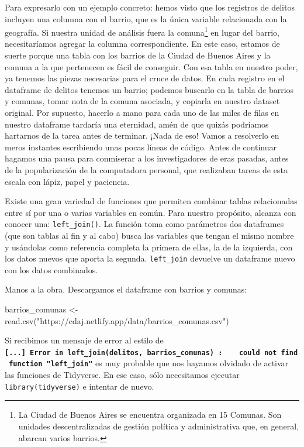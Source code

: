 \documentclass[
]{book}
\newenvironment{Shaded}{\begin{snugshade}}{\end{snugshade}}
\newcommand{\FunctionTok}[1]{\textcolor[rgb]{0.00,0.00,0.00}{#1}}
\newcommand{\NormalTok}[1]{#1}
\newcommand{\OtherTok}[1]{\textcolor[rgb]{0.56,0.35,0.01}{#1}}
\newcommand{\StringTok}[1]{\textcolor[rgb]{0.31,0.60,0.02}{#1}}
\begin{document}
Para expresarlo con un ejemplo concreto: hemos visto que los registros de delitos incluyen una columna con el barrio, que es la única variable relacionada con la geografía. Si nuestra unidad de análisis fuera la comuna\footnote{La Ciudad de Buenos Aires se encuentra organizada en 15 Comunas. Son unidades descentralizadas de gestión política y administrativa que, en general, abarcan varios barrios.} en lugar del barrio, necesitaríamos agregar la columna correspondiente. En este caso, estamos de suerte porque una tabla con los barrios de la Ciudad de Buenos Aires y la comuna a la que pertenecen es fácil de conseguir. Con esa tabla en nuestro poder, ya tenemos las piezas necesarias para el cruce de datos. En cada registro en el dataframe de delitos tenemos un barrio; podemos buscarlo en la tabla de barrios y comunas, tomar nota de la comuna asociada, y copiarla en nuestro dataset original. Por supuesto, hacerlo a mano para cada uno de las miles de filas en nuestro dataframe tardaría una eternidad, amén de que quizás podríamos hartarnos de la tarea antes de terminar. ¡Nada de eso! Vamos a resolverlo en meros instantes escribiendo unas pocas líneas de código. Antes de continuar hagamos una pausa para conmiserar a los investigadores de eras pasadas, antes de la popularización de la computadora personal, que realizaban tareas de esta escala con lápiz, papel y paciencia.

Existe una gran variedad de funciones que permiten combinar tablas relacionadas entre sí por una o varias variables en común. Para nuestro propósito, alcanza con conocer una: \texttt{left\_join()}. La función toma como parámetros dos dataframes (que son tablas al fin y al cabo) busca las variables que tengan el mismo nombre y usándolas como referencia completa la primera de ellas, la de la izquierda, con los datos nuevos que aporta la segunda. \texttt{left\_join} devuelve un dataframe nuevo con los datos combinados.

Manos a la obra. Descargamos el dataframe con barrios y comunas:

\begin{Shaded}
\begin{Highlighting}[]
\NormalTok{barrios\_comunas }\OtherTok{\textless{}{-}} \FunctionTok{read.csv}\NormalTok{(}\StringTok{"https://cdaj.netlify.app/data/barrios\_comunas.csv"}\NormalTok{)}
\end{Highlighting}
\end{Shaded}

Si recibimos un mensaje de error al estilo de \textbf{\texttt{{[}...{]}\ Error\ in\ left\_join(delitos,\ barrios\_comunas)\ :\ \ \ \ could\ not\ find\ function\ "left\_join"}} es muy probable que nos hayamos olvidado de activar las funciones de Tidyverse. En ese caso, sólo necesitamos ejecutar \texttt{library(tidyverse)} e intentar de nuevo.
\end{document}
